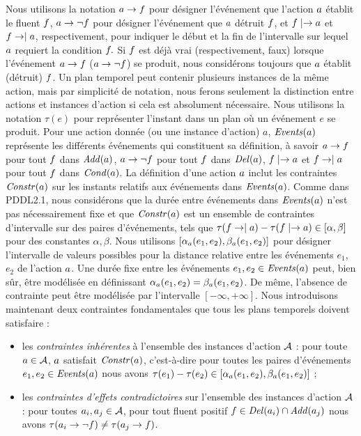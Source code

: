 Nous utilisons la notation $a \rightarrow f$ pour désigner l'événement que l'action $a$ établit le fluent $f$, $a \rightarrow \neg f$ pour désigner l'événement que $a$ détruit $f$, et $f \mid\rightarrow a$ et $f \rightarrow\mid a$, respectivement, pour indiquer le début et la fin de l'intervalle sur lequel $a$ requiert la condition $f.$ Si $f$ est déjà vrai (respectivement, faux) lorsque l'événement
$a \rightarrow f$ ($a \rightarrow \neg f$) se produit, nous considérons toujours que $a$ établit (détruit) $f$. Un plan temporel peut contenir plusieurs instances de la même action, mais %
par simplicité de notation, nous ferons seulement la distinction entre actions et instances d'action si cela est absolument nécessaire. Nous utilisons la notation $\tau(e)$ pour représenter l'instant dans un plan où un événement $e$ se produit.
Pour une action donnée (ou une instance d'action) $a$, $\mathit{Events}(a)$ représente les différents événements qui constituent sa définition, à savoir $a \rightarrow f$ pour tout $f$ dans $\mathit{Add}(a)$, $a \rightarrow \neg f$ pour tout $f$ dans $\mathit{Del}(a)$, $f \mid\rightarrow a$ et $f \rightarrow\mid a$ pour tout $f$ dans $\mathit{Cond}(a)$. La définition d'une action $a$ inclut les contraintes $\mathit{Constr}(a)$ sur les instants relatifs aux événements dans $\mathit{Events}(a)$. %
Comme dans PDDL2.1, nous considérons que la durée entre événements dans $\mathit{Events}(a)$ n'est pas nécessairement fixe et que $\mathit{Constr}(a)$ est un ensemble de contraintes d'intervalle sur des paires d'événements, tels que
$\tau(f \rightarrow\mid a) - \tau(f \mid\rightarrow a) \in [\alpha,\beta]$ pour des constantes $\alpha,\beta$. Nous utilisons $[\alpha_{a}(e_1, e_2), \beta_{a}(e_1, e_2)]$ pour désigner l'intervalle de valeurs possibles pour la distance relative entre les événements $e_1$, $e_2$ de l'action $a$. Une durée fixe entre les événements $e_1,e_2 \in \mathit{Events}(a)$ peut, bien s\^{u}r, être modélisée en définissant $\alpha_{a}(e_1, e_2)=\beta_{a}(e_1, e_2)$. De même, l'absence de contrainte peut être modélisée par l'intervalle $[-\infty,+\infty]$. Nous introduisons maintenant deux contraintes fondamentales que tous les plans temporels doivent satisfaire :
\begin{itemize}
\item les \emph{contraintes inhérentes} à l'ensemble des instances d'action $\mathcal{A}$ : pour toute $a\in\mathcal{A}$, $a$ satisfait $\mathit{Constr}(a)$, c'est-à-dire pour toutes les paires d'événements $e_1,e_2\in \mathit{Events}(a)$ nous avons $\tau(e_1) - \tau(e_2) \in [\alpha_a(e_1,e_2),\beta_a(e_1,e_2)]$ ;
\item les \emph{contraintes d'effets contradictoires} sur l'ensemble des instances d'action $\mathcal{A}$ : pour toutes $a_i,a_j \in\mathcal{A}$, pour tout fluent positif $f \in \mathit{Del}(a_i) \cap \mathit{Add}(a_j)$ nous avons $\tau(a_i \rightarrow \neg f) \neq \tau(a_j \rightarrow f)$.
\end{itemize}

